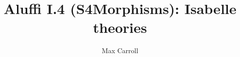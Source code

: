 \documentclass[11pt,a4paper]{article}
\begin{document}
\title{Aluffi I.4 (S4Morphisms): Isabelle theories}
\author{Max Carroll}
\maketitle


\end{document}
